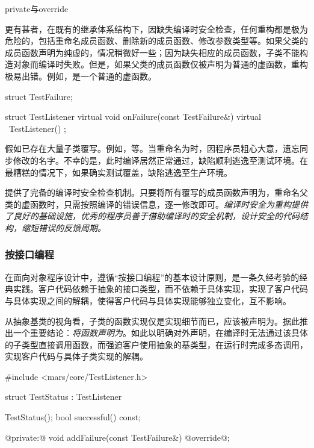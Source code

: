 \begin{content}
\begin{episode}{private与override}
\begin{content}
更有甚者，在既有的继承体系结构下，因缺失编译时安全检查，任何重构都是极为危险的，包括重命名成员函数、删除新的成员函数、修改参数类型等。如果父类的成员函数声明为纯虚的，情况稍微好一些；因为缺失相应的成员函数，子类不能构造对象而编译时失败。但是，如果父类的成员函数仅被声明为普通的虚函数，重构极易出错。例如，是一个普通的虚函数。

\begin{c++}
struct TestFailure;

struct TestListener {
  virtual void onFailure(const TestFailure&) {}
  virtual ~TestListener() {}
};
\end{c++}

假如已存在大量子类覆写。例如，等。当重命名为时，因程序员粗心大意，遗忘同步修改的名字。不幸的是，此时编译居然正常通过，缺陷顺利逃逸至测试环境。在最糟糕的情况下，如果确实测试覆盖，缺陷逃逸至生产环境。

提供了完备的编译时安全检查机制。只要将所有覆写的成员函数声明为，重命名父类的虚函数时，只需按照编译的错误信息，逐一修改即可。\emph{编译时安全为重构提供了良好的基础设施，优秀的程序员善于借助编译时的安全机制，设计安全的代码结构，缩短错误的反馈周期。}

\subsubsection{按接口编程}

在面向对象程序设计中，遵循“按接口编程”的基本设计原则，是一条久经考验的经典实践。客户代码依赖于抽象的接口类型，而不依赖于具体实现，实现了客户代码与具体实现之间的解耦，使得客户代码与具体实现能够独立变化，互不影响。

从抽象基类的视角看，子类的函数实现仅是实现细节而已，应该被声明为。据此推出一个重要结论：\emph{将函数声明为}。如此以明确对外声明，在编译时无法通过该具体的子类型直接调用函数，而强迫客户使用抽象的基类型，在运行时完成多态调用，实现客户代码与具体子类实现的解耦。

\begin{c++}
#include <mars/core/TestListener.h>

struct TestStatus : TestListener {
  TestStatus();
  bool successful() const;

@private:@
  void addFailure(const TestFailure&) @override@;

}
\end{c++}
\end{content}
\end{episode}
\end{content}
